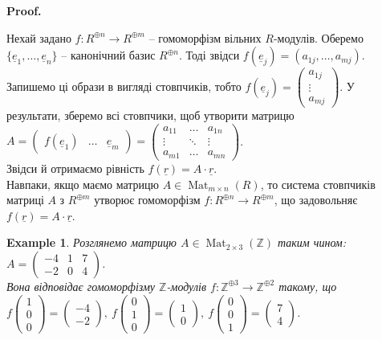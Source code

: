 \documentclass[a4paper, 10pt]{article}
\makeatletter
\theoremstyle{theoremdd}
\theoremstyle{theoremdd}
\theoremstyle{theoremdd}
\theoremstyle{theoremdd}
\theoremstyle{theoremdd}
\newtheorem{example}[theorem]{Example}
\theoremstyle{theoremdd}
\theoremstyle{theoremdd}
\theoremstyle{theoremdd}
\theoremstyle{theoremdd}
\theoremstyle{theoremdd}
\theoremstyle{theoremdd}
\theoremstyle{theoremdd}
\theoremstyle{theoremdd}
\theoremstyle{theoremdd}
\theoremstyle{theoremdd}
\renewenvironment{proof}[1][Proof.\\]{\par
\pushQED{\hfill \qed}%
\normalfont \topsep6\p@\@plus6\p@\relax
\trivlist
\item\relax
{\bfseries
#1\@addpunct{.}}\hspace\labelsep\ignorespaces
}{%
\popQED\endtrivlist\@endpefalse
}
\DeclareMathOperator{\Mat}{Mat}
\makeatother
\begin{document}
\begin{proof}
Нехай задано $f \colon R^{\oplus n} \to R^{\oplus m}$ -- гомоморфізм вільних $R$-модулів. Оберемо $\{\underline{e}_1,\dots,\underline{e}_n\}$ -- канонічний базис $R^{\oplus n}$. Тоді звідси $f(\underline{e}_j) = (a_{1j},\dots,a_{mj})$. Запишемо ці образи в вигляді стовпчиків, тобто $f(\underline{e}_j) = \begin{pmatrix}
a_{1j} \\ \vdots \\ a_{mj}
\end{pmatrix}$. У результати, зберемо всі стовпчики, щоб утворити матрицю \\
$A = \begin{pmatrix}
f(\underline{e}_1) & \dots & \underline{e}_m
\end{pmatrix} = \begin{pmatrix}
a_{11} & \dots & a_{1n} \\
\vdots & \ddots & \vdots \\
a_{m1} & \dots & a_{mn}
\end{pmatrix}$.\\
Звідси й отримаємо рівність $f(\underline{r}) = A \cdot \underline{r}$.
\bigskip \\
Навпаки, якщо маємо матрицю $A \in \Mat_{m \times n}(R)$, то система стовпчиків матриці $A$ з $R^{\oplus m}$ утворює гомоморфізм $f \colon R^{\oplus n} \to R^{\oplus m}$, що задовольняє $f(\underline{r}) = A \cdot \underline{r}$.
\end{proof}

\begin{example}
Розглянемо матрицю $A \in \Mat_{2 \times 3}(\mathbb{Z})$ таким чином: \\ $A = \begin{pmatrix}
-4 & 1 & 7 \\
-2 & 0 & 4
\end{pmatrix}$. \\
Вона відповідає гомоморфізму $\mathbb{Z}$-модулів $f \colon \mathbb{Z}^{\oplus 3} \to \mathbb{Z}^{\oplus 2}$ такому, що\\
$f\begin{pmatrix}
1 \\ 0 \\ 0
\end{pmatrix} = \begin{pmatrix}
-4 \\ -2
\end{pmatrix},\ f\begin{pmatrix}
0 \\ 1 \\ 0
\end{pmatrix} = \begin{pmatrix}
1 \\ 0
\end{pmatrix},\ f\begin{pmatrix}
0 \\ 0 \\ 1
\end{pmatrix} = \begin{pmatrix}
7 \\ 4
\end{pmatrix}$.
\end{example}
\end{document}
